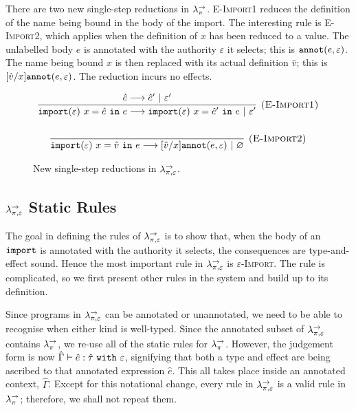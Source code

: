 There are two new single-step reductions in $\lambda^{\rightarrow}_{\pi}$. \textsc{E-Import1} reduces the definition of the name being bound in the body of the import. The interesting rule is \textsc{E-Import2}, which applies when the definition of $x$ has been reduced to a value. The unlabelled body $e$ is annotated with the authority $\varepsilon$ it selects; this is $\mathtt{annot}(e, \varepsilon)$. The name being bound $x$ is then replaced with its actual definition $\hat v$; this is $[\hat v/x]\mathtt{annot}(e, \varepsilon)$. The reduction incurs no effects.

\begin{figure}[h]

\noindent
{}

\[
\begin{array}{c}
\infer[\textsc{(E-Import1)}]
	{\kwa{import}(\varepsilon)~x = \hat e~\kw{in} e \longrightarrow \kwa{import}(\varepsilon)~x = \hat e'~\kw{in} e~|~\varepsilon'}
	{\hat e \longrightarrow \hat e'~|~\varepsilon'}\\[4ex]

\infer[\textsc{(E-Import2)}]
	{\kwa{import}(\varepsilon)~x = \hat v~\kw{in} e \longrightarrow [\hat v/x]\kwa{annot}(e, \varepsilon)~|~\varnothing}
	{}

\end{array}
\]


\vspace{-7pt}
\caption{New single-step reductions in $\lambda^{\rightarrow}_{\pi, \varepsilon}$.}
\label{This is the label.}
\end{figure}


\subsection{$\lambda^{\rightarrow}_{\pi, \varepsilon}$ Static Rules}

The goal in defining the rules of $\lambda^{\rightarrow}_{\pi, \varepsilon}$ is to show that, when the body of an $\mathtt{import}$ is annotated with the authority it selects, the consequences are type-and-effect sound. Hence the most important rule in $\lambda^{\rightarrow}_{\pi, \varepsilon}$ is \textsc{$\varepsilon$-Import}. The rule is complicated, so we first present other rules in the system and build up to its definition.

Since programs in $\lambda^{\rightarrow}_{\pi, \varepsilon}$ can be annotated or unannotated, we need to be able to recognise when either kind is well-typed. Since the annotated subset of $\lambda^{\rightarrow}_{\pi, \varepsilon}$ contains $\lambda^{\rightarrow}_{\pi}$, we re-use all of the static rules for $\lambda^{\rightarrow}_{\pi}$. However, the judgement form is now $\hat \Gamma \vdash \hat e: \hat \tau~\mathtt{with}~ \varepsilon$, signifying that both a type and effect are being ascribed to that annotated expression $\hat e$. This all takes place inside an annotated context, $\hat \Gamma$. Except for this notational change, every rule in $\lambda^{\rightarrow}_{\pi, \varepsilon}$ is a valid rule in $\lambda^{\rightarrow}_{\pi}$; therefore, we shall not repeat them.

